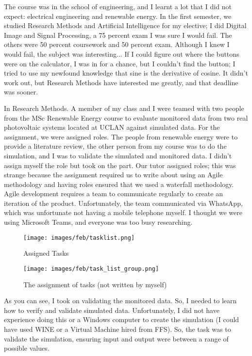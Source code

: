 \documentclass{article}
\begin{document}
The course was in the school of engineering, and I learnt a lot that I did not expect:  electrical engineering and renewable energy. In the first semester, we studied Research Methods and Artificial Intelligence for my elective; I did Digital Image and Signal Processing, a 75 percent exam I was sure I would fail. The others were 50 percent coursework and 50 percent exam. Although I knew I would fail, the subject was interesting...  If I could figure out where the buttons were on the calculator, I was in for a chance, but I couldn't find the button; I tried to use my newfound knowledge that sine is the derivative of cosine. It didn't work out, but Research Methods have interested me greatly, and that deadline was sooner.
 
In Research Methods. A member of my class and I were teamed with two people from the MSc Renewable Energy course to evaluate monitored data from two real photovoltaic systems located at UCLAN against simulated data. For the assignment, we were assigned roles. The people from renewable energy were to provide a literature review, the other person from my course was to do the simulation, and I was to validate the simulated and monitored data. I didn't assign myself the role but took on the part. Our tutor assigned roles; this was strange because the assignment required us to write about using an Agile methodology and having roles ensured that we used a waterfall methodology. Agile development requires a team to communicate regularly to create an iteration of the product. Unfortunately, the team communicated via WhatsApp, which was unfortunate not having a mobile telephone myself. I thought we were using Microsoft Teams, and everyone was too busy researching.

 \begin{figure}
\caption{Assigned Tasks}
\centering
\texttt{[image: images/feb/tasklist.png]}
\end{figure}
 
\begin{figure}
\caption{The assignment of tasks (not written by myself)}
\centering
\texttt{[image: images/feb/task\_list\_group.png]}
\end{figure}

As you can see, I took on validating the monitored data. So, I needed to learn how to verify and validate simulated data. Unfortunately, I did not have experience doing this or a Windows computer to create the simulation (I could have used WINE or a Virtual Machine hired from FFS). So, the task was to validate the simulation, ensuring input and output were between a range of possible values. 
\end{document}
